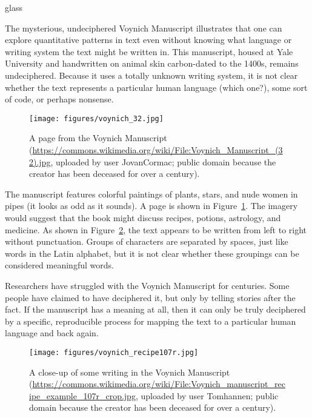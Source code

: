 \begin{tblsfilledsymbol}{}{glass}
\begin{underthehood}

The mysterious, undeciphered Voynich Manuscript illustrates that one can explore quantitative patterns in text even without knowing what language or writing system the text might be written in.    This manuscript, housed at Yale
University and handwritten on animal skin carbon-dated to the 1400s, 
remains undeciphered. Because it uses a totally unknown writing
system, it is not clear whether the text represents a particular human
language (which one?), some sort of code, or perhaps nonsense.


\begin{figure}[H]
    \texttt{[image: figures/voynich\_32.jpg]}
    \caption{A page from the Voynich Manuscript (\url{https://commons.wikimedia.org/wiki/File:Voynich_Manuscript_(32).jpg}, uploaded by user JovanCormac; public domain because the creator has been deceased for over a century).}
    \label{fig:voynich32}
\end{figure}




The manuscript features colorful paintings of plants, stars, and nude
women in pipes (it looks as odd as it sounds). A page is shown in
Figure~\ref{fig:voynich32}. The imagery would suggest that the book
might discuss recipes, potions, astrology, and medicine.  As shown in
Figure~\ref{fig:voynich-text}, the text appears to be written from
left to right without punctuation.  Groups of characters are separated
by spaces, just like words in the Latin alphabet, but it is not clear
whether these groupings can be considered meaningful words.



Researchers have struggled with the Voynich Manuscript for centuries.
Some people have claimed to have deciphered it, but only by telling
stories after the fact.  If the manuscript has a meaning at all, then
it can only be truly deciphered by a specific, reproducible process
for mapping the text to a particular human language and back again.


\begin{figure}[H]
    \texttt{[image: figures/voynich\_recipe107r.jpg]}
    \caption{A close-up of some writing in the Voynich Manuscript (\url{https://commons.wikimedia.org/wiki/File:Voynich_manuscript_recipe_example_107r_crop.jpg}, uploaded by user Tomhannen; public domain because the creator has been deceased for over a century).}
    \label{fig:voynich-text}
\end{figure}


\end{underthehood}
\end{tblsfilledsymbol}
